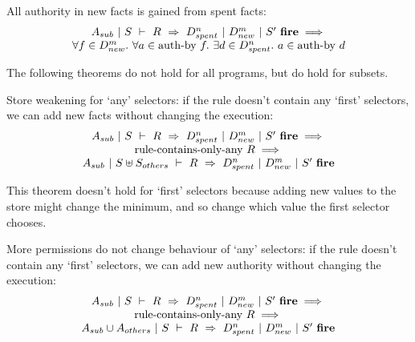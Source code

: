 \begin{theorem}
All authority in new facts is gained from spent facts:
$$
\begin{array}{c}
A_{sub}~|~S~\vdash~R~\Rightarrow~D_{spent}^n~|~D_{new}^m~|~S'~\textbf{fire}
\implies \\
\forall f \in D_{new}^m.\ \forall a \in \textrm{auth-by}~f.\ \exists d \in D_{spent}^n.\ a \in \textrm{auth-by}~d
\end{array}
$$
\end{theorem}

The following theorems do not hold for all programs, but do hold for subsets.

\begin{theorem}
Store weakening for `any' selectors: if the rule doesn't contain any `first' selectors, we can add new facts without changing the execution:
$$
\begin{array}{c}
A_{sub}~|~S~\vdash~R~\Rightarrow~D_{spent}^n~|~D_{new}^m~|~S'~\textbf{fire}
\implies \\
\textrm{rule-contains-only-any}~R \implies \\
A_{sub}~|~S \uplus S_{others}~\vdash~R~\Rightarrow~D_{spent}^n~|~D_{new}^m~|~S'~\textbf{fire}
\end{array}
$$
\end{theorem}

This theorem doesn't hold for `first' selectors because adding new values to the store might change the minimum, and so change which value the first selector chooses.

\begin{theorem}
More permissions do not change behaviour of `any' selectors: if the rule doesn't contain any `first' selectors, we can add new authority without changing the execution:
$$
\begin{array}{c}
A_{sub}~|~S~\vdash~R~\Rightarrow~D_{spent}^n~|~D_{new}^m~|~S'~\textbf{fire}
\implies \\
\textrm{rule-contains-only-any}~R \implies \\
A_{sub} \cup A_{others}~|~S~\vdash~R~\Rightarrow~D_{spent}^n~|~D_{new}^m~|~S'~\textbf{fire}
\end{array}
$$
\end{theorem}

